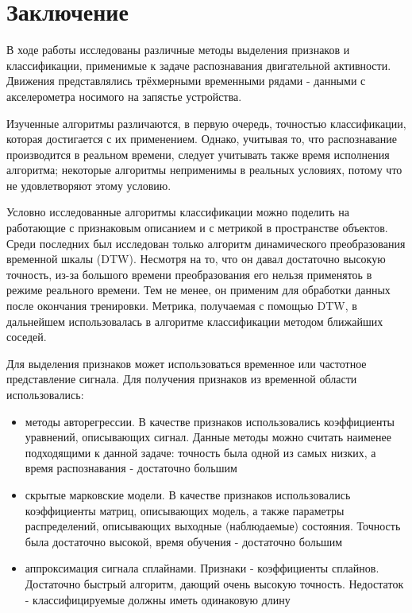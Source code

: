 \chapter{Заключение}

В ходе работы исследованы различные методы выделения признаков и классификации, применимые к задаче распознавания двигательной активности. Движения представлялись трёхмерными временными рядами - данными с акселерометра носимого на запястье устройства.

Изученные алгоритмы различаются, в первую очередь, точностью классификации, которая достигается с их применением. Однако, учитывая то, что распознавание производится в реальном времени, следует учитывать также время исполнения алгоритма; некоторые алгоритмы неприменимы в реальных условиях, потому что не удовлетворяют этому условию.

Условно исследованные алгоритмы классификации можно поделить на работающие с признаковым описанием и с метрикой в пространстве объектов. Среди последних был исследован только алгоритм динамического преобразования временной шкалы (DTW). Несмотря на то, что он давал достаточно высокую точность, из-за большого времени преобразования его нельзя применятоь в режиме реального времени. Тем не менее, он применим для обработки данных после окончания тренировки. Метрика, получаемая с помощью DTW, в дальнейшем использовалась в алгоритме классификации методом ближайших соседей.

Для выделения признаков может использоваться временное или частотное представление сигнала. Для получения признаков из временной области использовались:
\begin{itemize}
\item методы авторегрессии. В качестве признаков использовались коэффициенты уравнений, описывающих сигнал. Данные методы можно считать наименее подходящими к данной задаче: точность была одной из самых низких, а время распознавания - достаточно большим
\item скрытые марковские модели. В качестве признаков использовались коэффициенты матриц, описывающих модель, а также параметры распределений, описывающих выходные (наблюдаемые) состояния. Точность была достаточно высокой, время обучения - достаточно большим
\item аппроксимация сигнала сплайнами. Признаки - коэффициенты сплайнов. Достаточно быстрый алгоритм, дающий очень высокую точность. Недостаток - классифицируемые должны иметь одинаковую длину
\end{itemize}

